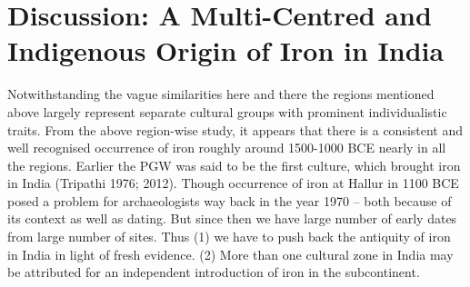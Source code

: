 \vspace{-.7cm}

\section*{Discussion: A Multi-Centred and Indigenous Origin of Iron in India}\label{chapter3-section-5}

Notwithstanding the vague similarities here and there the regions mentioned above largely represent separate cultural groups with prominent individualistic traits. From the above region-wise study, it appears that there is a consistent and well recognised occurrence of iron roughly around 1500-1000 BCE nearly in all the regions. Earlier the PGW was said to be the first culture, which brought iron in India (Tripathi 1976; 2012). Though occurrence of iron at Hallur in 1100 BCE posed a problem for archaeologists way back in the year 1970 – both because of its context as well as dating. But since then we have large number of early dates from large number of sites. Thus (1) we have to push back the antiquity of iron in India in light of fresh evidence. (2) More than one cultural zone in India may be attributed for an independent introduction of iron in the subcontinent.
